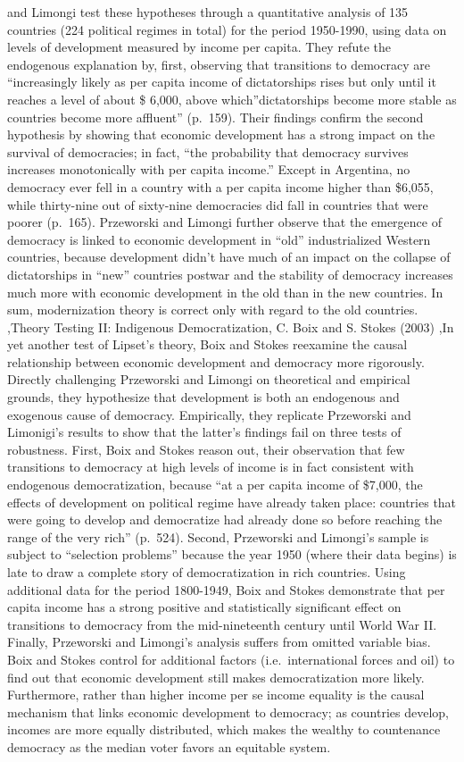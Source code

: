 \documentclass{book}
\begin{document}
and Limongi test these hypotheses through a quantitative analysis of 135
countries (224 political regimes in total) for the period 1950-1990, using
data on levels of development measured by income per capita. They refute the
endogenous explanation by, first, observing that transitions to democracy are
``increasingly likely as per capita income of dictatorships rises but only
until it reaches a level of about \$ 6,000, above which''dictatorships become
more stable as countries become more affluent'' (p.~159). Their findings
confirm the second hypothesis by showing that economic development has a
strong impact on the survival of democracies; in fact, ``the probability that
democracy survives increases monotonically with per capita income.'' Except in
Argentina, no democracy ever fell in a country with a per capita income higher
than \$6,055, while thirty-nine out of sixty-nine democracies did fall in
countries that were poorer (p.~165). Przeworski and Limongi further observe
that the emergence of democracy is linked to economic development in ``old''
industrialized Western countries, because development didn't have much of an
impact on the collapse of dictatorships in ``new'' countries postwar and the
stability of democracy increases much more with economic development in the
old than in the new countries. In sum, modernization theory is correct only
with regard to the old countries. ,Theory Testing II: Indigenous
Democratization, C. Boix and S. Stokes (2003) ,In yet another test of Lipset's
theory, Boix and Stokes reexamine the causal relationship between economic
development and democracy more rigorously. Directly challenging Przeworski and
Limongi on theoretical and empirical grounds, they hypothesize that
development is both an endogenous and exogenous cause of democracy.
Empirically, they replicate Przeworski and Limonigi's results to show that the
latter's findings fail on three tests of robustness. First, Boix and Stokes
reason out, their observation that few transitions to democracy at high levels
of income is in fact consistent with endogenous democratization, because ``at
a per capita income of \$7,000, the effects of development on political regime
have already taken place: countries that were going to develop and democratize
had already done so before reaching the range of the very rich'' (p.~524).
Second, Przeworski and Limongi's sample is subject to ``selection problems''
because the year 1950 (where their data begins) is late to draw a complete
story of democratization in rich countries. Using additional data for the
period 1800-1949, Boix and Stokes demonstrate that per capita income has a
strong positive and statistically significant effect on transitions to
democracy from the mid-nineteenth century until World War II. Finally,
Przeworski and Limongi's analysis suffers from omitted variable bias. Boix and
Stokes control for additional factors (i.e.~international forces and oil) to
find out that economic development still makes democratization more likely.
Furthermore, rather than higher income per se income equality is the causal
mechanism that links economic development to democracy; as countries develop,
incomes are more equally distributed, which makes the wealthy to countenance
democracy as the median voter favors an equitable system.
\end{document}

